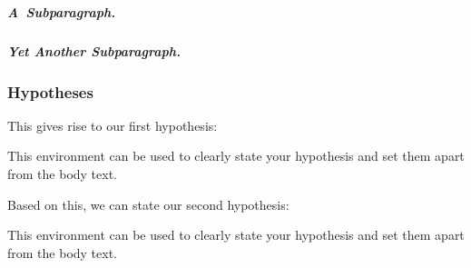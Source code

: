 \subparagraph{A~Subparagraph.}
\blindtext

\subparagraph{Yet Another Subparagraph.}
\blindtext

\subsubsection{Hypotheses}
\blindtext
This gives rise to our first hypothesis:

\begin{hypothesis} \label{hy:UNBAL}
This environment can be used to clearly state your hypothesis and set them apart from the body text.
\end{hypothesis}

\blindtext
Based on this, we can state our second hypothesis:

\begin{hypothesis} \label{hy:UNBAL_2}
This environment can be used to clearly state your hypothesis and set them apart from the body text.
\end{hypothesis}

\blindtext